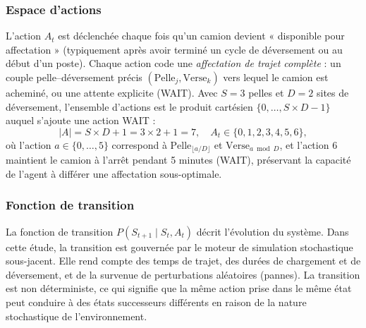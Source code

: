 \documentclass[11pt,a4paper]{article}
\begin{document}
\subsubsection{Espace d'actions}

L'action $A_t$ est déclenchée chaque fois qu'un camion devient « disponible pour affectation » (typiquement après avoir terminé un cycle de déversement ou au début d'un poste). Chaque action code une \emph{affectation de trajet complète} : un couple pelle--déversement précis $(\text{Pelle}_j, \text{Verse}_k)$ vers lequel le camion est acheminé, ou une attente explicite (WAIT). Avec $S=3$ pelles et $D=2$ sites de déversement, l'ensemble d'actions est le produit cartésien $\{0,\dots,S{\times}D{-}1\}$ auquel s'ajoute une action WAIT :
\begin{equation}
  |A| = S \times D + 1 = 3 \times 2 + 1 = 7,
  \quad A_t \in \{0, 1, 2, 3, 4, 5, 6\},
\end{equation}
où l'action $a \in \{0,\dots,5\}$ correspond à $\text{Pelle}_{\lfloor a/D \rfloor}$ et $\text{Verse}_{a \bmod D}$, et l'action $6$ maintient le camion à l'arrêt pendant 5 minutes (WAIT), préservant la capacité de l'agent à différer une affectation sous-optimale.

\subsubsection{Fonction de transition}

La fonction de transition $P(S_{t+1} \mid S_t, A_t)$ décrit l'évolution du système. Dans cette étude, la transition est gouvernée par le moteur de simulation stochastique sous-jacent. Elle rend compte des temps de trajet, des durées de chargement et de déversement, et de la survenue de perturbations aléatoires (pannes). La transition est non déterministe, ce qui signifie que la même action prise dans le même état peut conduire à des états successeurs différents en raison de la nature stochastique de l'environnement.
\end{document}
